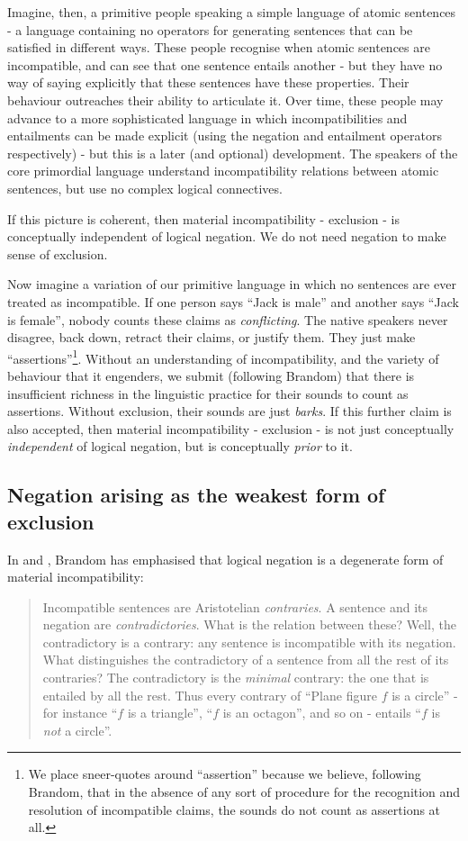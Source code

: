 Imagine, then, a primitive people speaking a simple language of
atomic sentences - a language containing no operators for generating
sentences that can be satisfied in different ways.  These people
recognise when atomic sentences are incompatible, and can see that one
sentence entails another - but they have no way of saying explicitly
that these sentences have these properties.  Their behaviour
outreaches their ability to articulate it.  Over time, these people
may advance to a more sophisticated language in which
incompatibilities and entailments can be made explicit (using the
negation and entailment operators respectively) - but this is a later
(and optional) development. The speakers of the core primordial
language understand incompatibility relations between atomic
sentences, but use no complex logical connectives.

If this picture is coherent, then material incompatibility - exclusion - is conceptually independent of logical negation.
We do not need negation to make sense of exclusion.

Now imagine a variation of our primitive language in which no sentences are ever treated as incompatible.
If one person says ``Jack is male'' and another says ``Jack is female'', nobody counts these claims as \emph{conflicting}. 
The native speakers never disagree, back down, retract their claims, or justify them. They just make ``assertions''\footnote{We place sneer-quotes around ``assertion'' because we believe, following Brandom, that in the absence of any sort of procedure for the recognition and resolution of incompatible claims, the sounds do not count as assertions at all.}.
Without an understanding of incompatibility, and the variety of behaviour that it engenders, we submit (following Brandom) that there is insufficient richness in the linguistic practice for their sounds to count as assertions.
Without exclusion, their sounds are just \emph{barks}.
If this further claim is also accepted, then material incompatibility - exclusion - is not just conceptually \emph{independent} of logical negation, but is conceptually \emph{prior} to it.

\subsection{Negation arising as the weakest form of exclusion}

In \cite{brandom2} and \cite{brandom}, Brandom has emphasised that logical negation is a degenerate form of material incompatibility:
\begin{quote}
Incompatible sentences are Aristotelian \emph{contraries}. A sentence and its negation are \emph{contradictories}. What is the relation between these? Well, the contradictory is a contrary: any sentence is incompatible with its negation. What distinguishes the contradictory of a sentence  from all the rest of its contraries? The contradictory is the \emph{minimal} contrary: the one that is entailed by all the rest. Thus every contrary of ``Plane figure $f$ is a circle'' - for instance ``$f$ is a triangle'', ``$f$ is an octagon'', and so on - entails ``$f$ is \emph{not} a circle''.
\end{quote}

